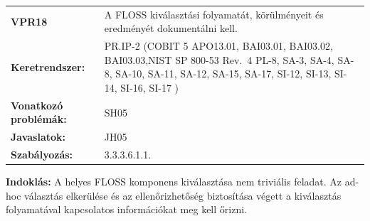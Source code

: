 \documentclass[12pt,magyar,a4paper,oneside]{scrreprt}
\begin{document}
\begin{longtable}[]{@{}ll@{}}
\toprule
\endhead
\begin{minipage}[t]{0.16\columnwidth}\raggedright
\textbf{VPR18}\strut
\end{minipage} & \begin{minipage}[t]{0.79\columnwidth}\raggedright
A FLOSS kiválasztási folyamatát, körülményeit és eredményét dokumentálni
kell.\strut
\end{minipage}\tabularnewline
\begin{minipage}[t]{0.16\columnwidth}\raggedright
\textbf{Keretrendszer:}\strut
\end{minipage} & \begin{minipage}[t]{0.79\columnwidth}\raggedright
PR.IP-2 (COBIT 5 APO13.01, BAI03.01, BAI03.02, BAI03.03,NIST SP 800-53
Rev.~4 PL-8, SA-3, SA-4, SA-8, SA-10, SA-11, SA-12, SA-15, SA-17, SI-12,
SI-13, SI-14, SI-16, SI-17 )\strut
\end{minipage}\tabularnewline
\begin{minipage}[t]{0.16\columnwidth}\raggedright
\textbf{Vonatkozó problémák:}\strut
\end{minipage} & \begin{minipage}[t]{0.79\columnwidth}\raggedright
SH05\strut
\end{minipage}\tabularnewline
\begin{minipage}[t]{0.16\columnwidth}\raggedright
\textbf{Javaslatok:}\strut
\end{minipage} & \begin{minipage}[t]{0.79\columnwidth}\raggedright
JH05\strut
\end{minipage}\tabularnewline
\begin{minipage}[t]{0.16\columnwidth}\raggedright
\textbf{Szabályozás:}\strut
\end{minipage} & \begin{minipage}[t]{0.79\columnwidth}\raggedright
3.3.3.6.1.1.\strut
\end{minipage}\tabularnewline
\bottomrule
\end{longtable}

\textbf{Indoklás: } A helyes FLOSS komponens kiválasztása nem triviális
feladat. Az ad-hoc választás elkerülése és az ellenőrizhetőség
biztosítása végett a kiválasztás folyamatával kapcsolatos információkat
meg kell őrizni.
\end{document}
